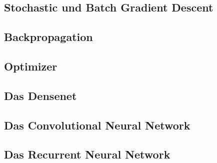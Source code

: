 \documentclass[conference, german]{IEEEtran}
\begin{document}
\subsection{Stochastic und Batch Gradient Descent}
\subsection{Backpropagation}
\subsection{Optimizer}
\subsection{Das Densenet}
\subsection{Das Convolutional Neural Network}
\subsection{Das Recurrent Neural Network}
\end{document}
